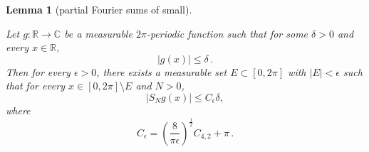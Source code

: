 \documentclass[10pt,a4paper]{article}
\theoremstyle{plain}
\newtheorem{lemma}[theorem]{Lemma}
\theoremstyle{definition}
\numberwithin{equation}{subsection}
\newcommand{\R}{{\mathbb{R}}}
\newcommand{\lean}[1]{}
\newcommand{\uses}[1]{}
\newcommand{\leanok}{}
\def\C{\mathbb{C}}
\begin{document}
\begin{lemma}[partial Fourier sums of small]
    \label{partial-Fourier-sums-of-small}
    \uses{real-Carleson-operator-measurable,real-Carleson,partial-Fourier-sum-bound}
    \leanok
    \lean{control_approximation_effect} %
    Let $g:\R\to\C$ be a measurable $2\pi$-periodic function such that for some $\delta>0$ and every $x\in\R$,
    \begin{equation} \label{g-small}
        |g(x)|\le \delta \,.
    \end{equation}
    Then for every $\epsilon>0$, there exists a measurable set $E\subset [0,2\pi]$ with $|E|<\epsilon$ such that for every $x\in [0,2\pi]\setminus E$ and $N>0$,
    \begin{equation}  \label{S-Ng-small}
        |S_N g(x)|\le C_\epsilon \delta,
    \end{equation}
    where
    \begin{equation} \label{C-epsilon-def}
        C_\epsilon = \left(\frac{8}{\pi\epsilon}\right)^\frac{1}{2} C_{4,2} + \pi \,.
    \end{equation}
\end{lemma}
\end{document}
